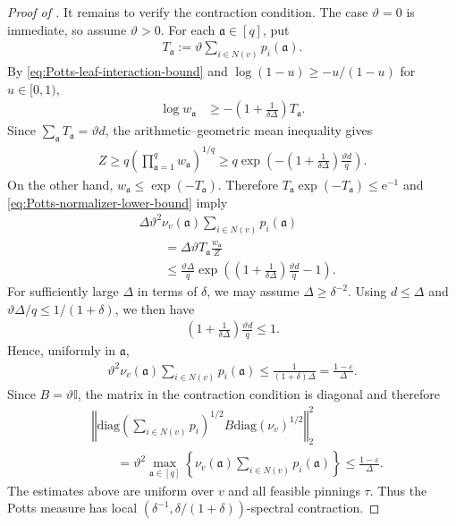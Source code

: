 \documentclass[a4paper,12pt]{article}
\theoremstyle{plain}
\theoremstyle{definition}
\def\-#1{\mathrm{#1}} %
\def\!#1{\mathfrak{#1}} %
\def\-#1{\mathrm{#1}} %
\def\!#1{\mathfrak{#1}} %
\newcommand{\e}{\mathrm{e}}
\renewcommand{\epsilon}{\varepsilon}
\newcommand{\norm}[1]{\left\Vert#1\right\Vert}
\newcommand{\set}[1]{\left\{#1\right\}}
\newcommand{\tuple}[1]{\left(#1\right)}
\newcommand{\tp}{\tuple}
\begin{document}
\begin{proof}[Proof of ]
It remains to verify the contraction condition.  The case
$\vartheta=0$ is immediate, so assume $\vartheta>0$.  For each
$\!a\in[q]$, put
\begin{align*}
  T_{\!a}:=\vartheta\sum_{i\in N(v)}p_i(\!a).
\end{align*}
By \eqref{eq:Potts-leaf-interaction-bound} and
$\log(1-u)\geq-u/(1-u)$ for $u\in[0,1)$,
\begin{align*}
  \log w_{\!a}
  &\geq
  -\tp{1+\frac1{\delta\Delta}}T_{\!a}.
\end{align*}
Since $\sum_{\!a}T_{\!a}=\vartheta d$, the arithmetic--geometric
mean inequality gives
\begin{align}
  Z
  \geq
  q\tp{\prod_{\!a=1}^q w_{\!a}}^{1/q}
  \geq
  q\exp\tp{
    -\tp{1+\frac1{\delta\Delta}}
    \frac{\vartheta d}{q}
  }.
  \label{eq:Potts-normalizer-lower-bound}
\end{align}
On the other hand, $w_{\!a}\leq\exp(-T_{\!a})$.  Therefore
$T_{\!a}\exp(-T_{\!a})\leq \e^{-1}$ and
\eqref{eq:Potts-normalizer-lower-bound} imply
\begin{align*}
  &\Delta\vartheta^2\nu_v(\!a)
    \sum_{i\in N(v)}p_i(\!a)
  \\
  &\qquad=
  \Delta\vartheta T_{\!a}\frac{w_{\!a}}Z
  \\
  &\qquad\leq
  \frac{\vartheta\Delta}{q}
  \exp\tp{
    \tp{1+\frac1{\delta\Delta}}
    \frac{\vartheta d}{q}-1
  }.
\end{align*}
For sufficiently large $\Delta$ in terms of $\delta$, we may assume
$\Delta\geq\delta^{-2}$.  Using $d\leq\Delta$ and
$\vartheta\Delta/q\leq1/(1+\delta)$, we then have
\begin{align*}
  \tp{1+\frac1{\delta\Delta}}
  \frac{\vartheta d}{q}
  \leq1.
\end{align*}
Hence, uniformly in $\!a$,
\begin{align*}
  \vartheta^2\nu_v(\!a)
  \sum_{i\in N(v)}p_i(\!a)
  \leq
  \frac1{(1+\delta)\Delta}
  =
  \frac{1-\epsilon}{\Delta}.
\end{align*}
Since $B=\vartheta\mathbb I$, the matrix in the contraction condition
is diagonal and therefore
\begin{align*}
  &\norm{
    \-{diag}\tp{\sum_{i\in N(v)}p_i}^{1/2}
    B
    \-{diag}(\nu_v)^{1/2}
  }_2^2
  \\
  &\qquad=
  \vartheta^2\max_{\!a\in[q]}\set{
    \nu_v(\!a)\sum_{i\in N(v)}p_i(\!a)
  }
  \leq
  \frac{1-\epsilon}{\Delta}.
\end{align*}
The estimates above are uniform over $v$ and all feasible pinnings
$\tau$.  Thus the Potts measure has local
$(\delta^{-1},\delta/(1+\delta))$-spectral contraction.


\end{proof}
\end{document}
